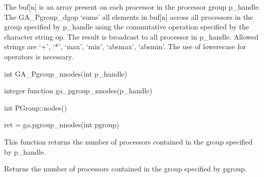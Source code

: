 \documentclass[12pt]{article}
\begin{document}
\begin{desc}
The buf[n] is an array present on each processor in the processor group
p_handle. The GA_Pgroup_dgop `sums' all elements in buf[n] across all
processors in the group specified by p_handle using the commutative operation
specified by the character string op.  The result is broadcast to all processor
in p_handle. Allowed strings are `+', `*', `max', `min', `absmax', `absmin'.
The use of lowerecase for operators is necessary.
\end{desc}




\begin{capi}
\begin{ccode}
int GA_Pgroup_nnodes(int p_handle)
\end{ccode}
\begin{funcargs}
\end{funcargs}
\end{capi}

\begin{fapi}
\begin{fcode}
integer function ga_pgroup_nnodes(p_handle)
\end{fcode}
\begin{funcargs}
\end{funcargs}
\end{fapi}

\begin{cxxapi}
\begin{cxxcode}
int PGroup::nodes()
\end{cxxcode}
\end{cxxapi}

\begin{pyapi}
\begin{pycode}
ret = ga.pgroup_nnodes(int pgroup)
\end{pycode}
\begin{funcargs}
\end{funcargs}
\end{pyapi}

\local

\begin{desc}
This function returns the number of processors contained in the group specified
by p_handle.

Returns the number of processors contained in the group specified by
pgroup.
\end{desc}
\end{document}
